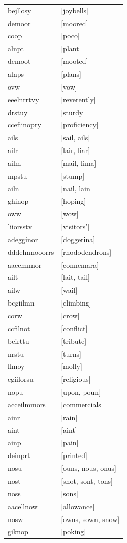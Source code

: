 \documentclass{article}
\begin{document}
\begin{tabular}{ll}
bejllosy & [joybells] \\
demoor & [moored] \\
coop & [poco] \\
alnpt & [plant] \\
demoot & [mooted] \\
alnps & [plans] \\
ovw & [vow] \\
eeelnrrtvy & [reverently] \\
drstuy & [sturdy] \\
ccefiinopry & [proficiency] \\
ails & [sail, ails] \\
ailr & [lair, liar] \\
ailm & [mail, lima] \\
mpstu & [stump] \\
ailn & [nail, lain] \\
ghinop & [hoping] \\
oww & [wow] \\
'iiorsstv & [visitors'] \\
adegginor & [doggerina] \\
dddehnnooorrs & [rhododendrons] \\
aacemnnor & [connemara] \\
ailt & [lait, tail] \\
ailw & [wail] \\
bcgiilmn & [climbing] \\
corw & [crow] \\
ccfilnot & [conflict] \\
beirttu & [tribute] \\
nrstu & [turns] \\
llmoy & [molly] \\
egiilorsu & [religious] \\
nopu & [upon, poun] \\
acceilmmors & [commercials] \\
ainr & [rain] \\
aint & [aint] \\
ainp & [pain] \\
deinprt & [printed] \\
nosu & [ouns, nous, onus] \\
nost & [snot, sont, tons] \\
noss & [sons] \\
aacellnow & [allowance] \\
nosw & [owns, sown, snow] \\
giknop & [poking] \\

\end{tabular}
\end{document}
